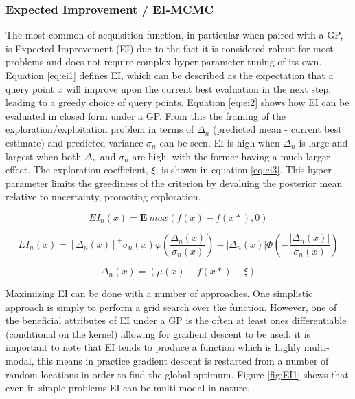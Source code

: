 \documentclass{article}
\begin{document}
		\subsubsection{Expected Improvement / EI-MCMC}\label{EI}

			The most common of acquisition function, in particular when paired with a GP, is Expected Improvement (EI) due to the fact it is considered robust for most problems and does not require complex hyper-parameter tuning of its own. Equation \ref{eq:ei1} defines EI, which can be described as the expectation that a query point \(x\) will improve upon the current best evaluation in the next step, leading to a greedy choice of query points. Equation \ref{eq:ei2} shows how EI can be evaluated in closed form under a GP. From this the framing of the exploration/exploitation problem in terms of \(\Delta_n\) (predicted mean - current best estimate) and predicted variance \(\sigma_n\) can be seen. EI is high when \(\Delta_n\) is large and largest when both  \(\Delta_n\) and \(\sigma_n\) are high, with the former having a much larger effect. The exploration coefficient, \(\xi\), is shown in equation \ref{eq:ei3}. This hyper-parameter limits the greediness of the criterion by devaluing the posterior mean relative to uncertainty, promoting exploration.

			 

			\begin{equation}\label{eq:ei1} EI_n(x) = \mathbf{E} ~max(f(x) -f(x*),0)\end{equation}

			\begin{equation}\label{eq:ei2} EI_n(x) = [\Delta_n(x)]^+ \sigma_n(x)\varphi\left(\frac{\Delta_n(x)}{\sigma_n(x)}\right)  - |\Delta_n(x)| \Phi\left(-\frac{|\Delta_n(x)|}{\sigma_n(x)}\right)\end{equation}

			\begin{equation}\label{eq:ei3}\Delta_n(x) = (\mu(x) - f(x*) - \xi) \end{equation}


			Maximizing EI can be done with a number of approaches. One simplistic approach is simply to perform a grid search over the function. However, one of the beneficial attributes of EI under a GP is the often at least ones differentiable (conditional on the kernel) allowing for gradient descent to be used. it is important to note that EI tends to produce a function which is highly multi-modal, this means in practice gradient descent is restarted from a number of random locations in-order to find the global optimum. Figure \ref{fig:EI1} shows that even in simple problems EI can be multi-modal in nature.
				
\end{document}
